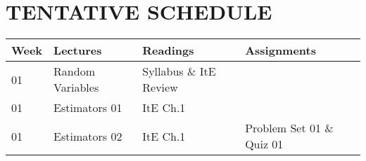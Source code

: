 \section*{TENTATIVE SCHEDULE}

\begin{center}
    \begin{tabular}{llll}
        \toprule
        \textbf{Week} & \textbf{Lectures} & \textbf{Readings} & \textbf{Assignments} \\
        \midrule
        01 & Random Variables & Syllabus \& ItE Review &  \\
        01 & Estimators 01 & ItE Ch.1 & \\
        01 & Estimators 02 & ItE Ch.1 & Problem Set 01 \& Quiz 01 \\
        \bottomrule
    \end{tabular}
\end{center}